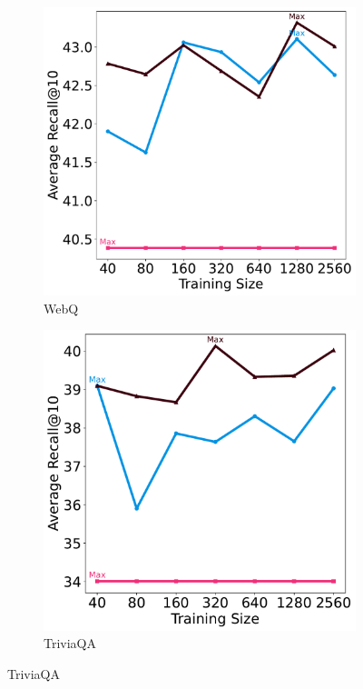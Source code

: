 \documentclass[sigconf,natbib=true,anonymous=false]{acmart}
\begin{document}
\begin{figure}[htbp]
\begin{minipage}{0.23\textwidth}
        \begin{subfigure}[b]{\textwidth}
            \includegraphics[width=\textwidth]{Figures/r_retriever_k_multi_avg_squad1.pdf}
            \caption{WebQ}
            \label{fig:webq}
        \end{subfigure}
    \end{minipage}
    \begin{minipage}{0.23\textwidth}
        \begin{subfigure}[b]{\textwidth}
            \includegraphics[width=\textwidth]{Figures/r_retriever_k_multi_avg_trivia.pdf}
            \caption{TriviaQA}
            \label{fig:trivia}
        \end{subfigure}


\end{minipage}
\end{figure}
\end{document}
